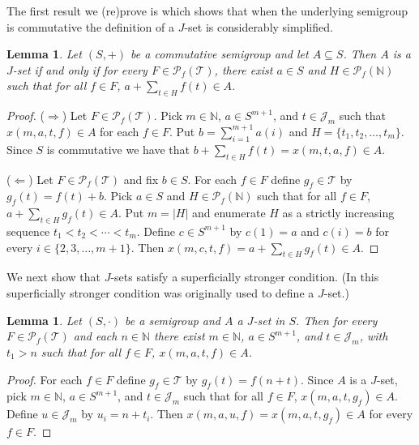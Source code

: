\documentclass[12pt,showtrims]{memoir}
\theoremstyle{plain}
\newtheorem{lem}[thm]{Lemma}
\theoremstyle{definition}
\newcommand{\bbN}{\mathbb{N}}
\newcommand{\calJ}{\mathcal{J}}
\newcommand{\calT}{\mathcal{T}}
\newcommand{\Pf}{\mathcal{P}_f}
\begin{document}
The first result we (re)prove is \cite[Lemma 2.4]{Hindman:2010fk} which shows that when the underlying semigroup is commutative the definition of a $J$-set is considerably simplified. 

\begin{lem}
  \label{lem:comm-jsets}
  Let $(S, +)$ be a commutative semigroup and let $A \subseteq S$. 
  Then $A$ is a $J$-set if and only if for every $F \in \Pf(\calT)$, there exist $a \in S$ and $H \in \Pf(\bbN)$ such that for all $f \in F$, $a + \sum_{t \in H} f(t) \in A$.
\end{lem}
\begin{proof}
  ($\Rightarrow$)
  Let $F \in \Pf(\calT)$.
  Pick $m \in \bbN$, $a \in S^{m+1}$, and $t \in \calJ_m$ such that $x(m, a, t, f) \in A$ for each $f \in F$.
  Put $b = \sum_{i=1}^{m+1} a(i)$ and $H = \{t_1, t_2, \ldots, t_m\}$.
  Since $S$ is commutative we have that $b + \sum_{t \in H} f(t) = x(m, t, a, f) \in A$.

  ($\Leftarrow$)
  Let $F \in \Pf(\calT)$ and fix $b \in S$.
  For each $f \in F$ define $g_f \in \calT$ by $g_f(t) = f(t)+b$. 
  Pick $a \in S$ and $H \in \Pf(\bbN)$ such that for all $f \in F$, $a + \sum_{t \in H} g_f(t) \in A$. 
  Put $m = |H|$ and enumerate $H$ as a strictly increasing sequence $t_1 < t_2 < \cdots < t_m$. 
  Define $c \in S^{m+1}$ by $c(1) = a$ and $c(i) = b$ for every $i \in \{2, 3, \ldots, m+1\}$.
  Then $x(m, c, t, f) = a + \sum_{t \in H} g_f(t) \in A$.
\end{proof}

We next show that $J$-sets satisfy a superficially stronger condition.
(In \cite[Definition 3.3(e)]{De:2008uq} this superficially stronger condition was originally used to define a $J$-set.)

\begin{lem}
  \label{lem:jset-start}
  Let $(S, \cdot)$ be a semigroup and $A$ a $J$-set in $S$.
  Then for every $F \in \Pf(\calT)$ and each $n \in \bbN$ there exist $m \in \bbN$, $a \in S^{m+1}$, and $t \in \calJ_m$, with $t_1 > n$ such that for all $f \in F$, $x(m, a, t, f) \in A$.
\end{lem}
\begin{proof}
  For each $f \in F$ define $g_f \in \calT$ by $g_f(t) = f(n+t)$.
  Since $A$ is a $J$-set, pick $m \in \bbN$, $a \in S^{m+1}$, and $t \in \calJ_m$ such that for all $f \in F$, $x(m, a, t, g_f) \in A$. 
  Define $u \in \calJ_m$ by $u_i =  n + t_i$.
  Then $x(m, a, u, f) = x(m, a, t, g_f) \in A$ for every $f \in F$.
\end{proof}
\end{document}

